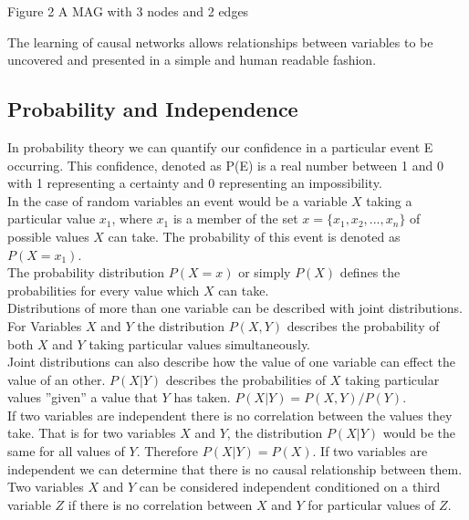 \documentclass{article}
\begin{document}
\begin{center}
Figure 2 A MAG with 3 nodes and 2 edges
\end{center}


The learning of causal networks allows relationships between variables to be uncovered and presented in a simple and human readable fashion.
\\

\subsection{Probability and Independence}
In probability theory we can quantify our confidence in a particular event E occurring. This confidence, denoted as P(E) is a real number between 1 and 0 with 1 representing a certainty and 0 representing an impossibility.
\\

In the case of random variables an event would be a variable $X$ taking a particular value $x_1$, where $x_1$ is a member of the set $x = \{x_1, x_2, ..., x_n\}$ of possible values $X$ can take. The probability of this event is denoted as $P(X=x_1)$.
\\

The probability distribution $P(X=x)$ or simply $P(X)$ defines the probabilities for every value which $X$ can take. 
\\

Distributions of more than one variable can be described with joint distributions. For Variables $X$ and $Y$ the distribution $P(X,Y)$  describes the probability of both $X$ and $Y$ taking particular values simultaneously. 
\\

Joint distributions can also describe how the value of one variable can effect the value of an other. $P(X|Y)$ describes the probabilities of $X$ taking particular values ''given'' a value that $Y$ has taken. $P(X|Y) = P(X,Y)/P(Y)$.
\\

If two variables are independent there is no correlation between the values they take. That is for two variables $X$ and $Y$, the distribution $P(X|Y)$ would be the same for all values of $Y$. Therefore $P(X|Y) = P(X)$. If two variables are independent we can determine that there is no causal relationship between them.\\

Two variables $X$ and $Y$ can be considered independent conditioned on a third variable $Z$ if there is no correlation between $X$ and $Y$ for particular values of $Z$.\\
\end{document}
